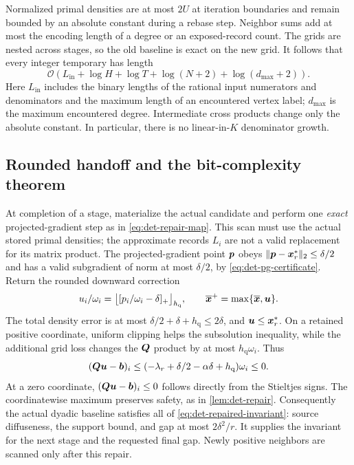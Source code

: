 Normalized primal densities are at most $2U$ at iteration boundaries and
remain bounded by an absolute constant during a rebase step. Neighbor sums
add at most the encoding length of a degree or an exposed-record count.
The grids are nested across stages, so the old baseline is exact on the
new grid. It follows that every integer temporary has length
\begin{equation}
 \mathcal{O}\!\left(L_{\mathrm{in}}+\log H+\log T+
       \log(N+2)+\log(d_{\max}+2)\right).
 \label{eq:bounded-integer-length}
\end{equation}
Here $L_{\mathrm{in}}$ includes the binary lengths of the rational input
numerators and denominators and the maximum length of an encountered vertex
label; $d_{\max}$ is the maximum encountered degree. Intermediate cross products change only the absolute
constant. In particular, there is no linear-in-$K$ denominator growth.

\subsection{Rounded handoff and the bit-complexity theorem}

At completion of a stage, materialize the actual candidate and perform one
\emph{exact} projected-gradient step as in \cref{eq:det-repair-map}.
This scan must use the actual stored primal densities; the approximate
records $L_i$ are not a valid replacement for its matrix product.
The projected-gradient point $\bm{p}$ obeys
$\lVert\bm{p}-\bm{x}_r^*\rVert_2\leq\delta/2$ and has a valid subgradient of
norm at most $\delta/2$, by \cref{eq:det-pg-certificate}. Return the
rounded downward correction
\begin{equation}
 u_i/\omega_i=
    \bigl\lfloor[p_i/\omega_i-\delta]_+\bigr\rfloor_{h_{\mathrm{q}}},
 \qquad \overline{\bm{x}}^+=\max\{\overline{\bm{x}},\bm{u}\}.
 \label{eq:bounded-terminal-repair}
\end{equation}
The total density error is at most
$\delta/2+\delta+h_{\mathrm{q}}\leq2\delta$, and $\bm{u}\leq\bm{x}_r^*$.
On a retained positive coordinate, uniform clipping helps the subsolution
inequality, while the additional grid loss changes the $\bm{Q}$ product by
at most $h_{\mathrm{q}}\omega_i$. Thus
\[
 (\bm{Q}\bm{u}-\bm{b})_i
 \leq(-\lambda_r+\delta/2-\alpha\delta+h_{\mathrm{q}})\omega_i\leq0.
\]
At a zero coordinate, $(\bm{Q}\bm{u}-\bm{b})_i\leq0$ follows directly from
the Stieltjes signs. The coordinatewise
maximum preserves safety, as in \cref{lem:det-repair}. Consequently the
actual dyadic baseline satisfies all of \cref{eq:det-repaired-invariant}:
source diffuseness, the support bound, and gap at most $2\delta^2/r$.
It supplies the invariant for the next stage and the requested final gap.
Newly positive neighbors are scanned only after this repair.

